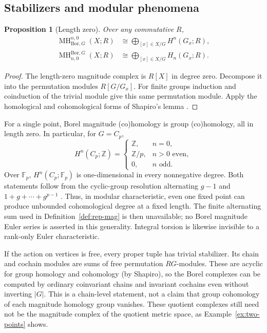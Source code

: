 \documentclass[11pt,a4paper]{article}
\numberwithin{equation}{section}
\newtheorem{proposition}[theorem]{Proposition}
\theoremstyle{definition}
\theoremstyle{remark}
\newcommand{\Z}{\mathbb Z}
\newcommand{\F}{\mathbb F}
\newcommand{\G}{G}
\newcommand{\MH}{\operatorname{MH}}
\newcommand{\Bor}{\mathrm{Bor}}
\begin{document}
\subsection{Stabilizers and modular phenomena}

\begin{proposition}[Length zero]\label{prop:length-zero}
 Over any commutative $R$,
 \begin{align}
 \MH^{n,0}_{\Bor,\G}(X;R)
   &\cong\bigoplus_{[x]\in X/\G}H^n(\G_x;R),\\
 \MH^{\Bor,\G}_{n,0}(X;R)
   &\cong\bigoplus_{[x]\in X/\G}H_n(\G_x;R).
 \end{align}
\end{proposition}
\begin{proof}
The length-zero magnitude complex is $R[X]$ in degree zero.  Decompose
it into the permutation modules $R[\G/\G_x]$.  For finite groups
induction and coinduction of the trivial module give this same
permutation module.  Apply the homological and cohomological forms of
Shapiro's lemma \cite[Ch.~III]{Brown}.
\end{proof}

For a single point, Borel magnitude (co)homology is group
(co)homology, all in length zero.  In particular, for $\G=C_p$,
\[
 H^n(C_p;\Z)=
 \begin{cases}
 \Z,&n=0,\\
 \Z/p,&n>0\text{ even},\\
 0,&n\text{ odd}.
 \end{cases}
\]
Over $\F_p$, $H^n(C_p;\F_p)$ is one-dimensional in every
nonnegative degree.  Both statements follow from the cyclic-group
resolution alternating $g-1$ and $1+g+\cdots+g^{p-1}$
\cite[Ch.~I, \S6]{Brown}.  Thus, in modular characteristic, even one
fixed point can produce unbounded cohomological degree at a fixed
length.  The finite alternating sum used in
Definition~\ref{def:rep-mag} is then unavailable; no Borel magnitude
Euler series is asserted in this generality.  Integral torsion is
likewise invisible to a rank-only Euler characteristic.

If the action on vertices is free, every proper tuple has trivial
stabilizer.  Its chain and cochain modules are sums of free permutation
$R\G$-modules.  These are acyclic for group homology and cohomology
(by Shapiro), so the Borel complexes can be computed by ordinary
coinvariant chains and invariant cochains even without inverting
$|\G|$.  This is a chain-level statement, not a claim that group
cohomology of each magnitude homology group vanishes.  These quotient
complexes still need not be the magnitude complex of the quotient
metric space, as Example~\ref{ex:two-points} shows.
\end{document}
